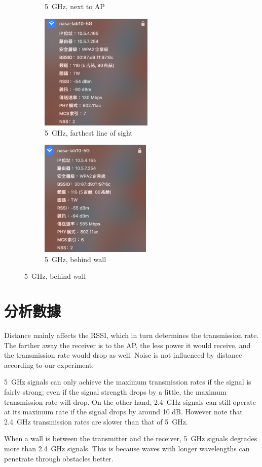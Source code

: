 \documentclass[12pt, a4paper]{article}
\begin{document}
\begin{figure}[H]
\begin{subfigure}{0.32\textwidth}
      \caption{5~GHz, next to AP}
    \end{subfigure}
    \hfill
    \begin{subfigure}{0.32\textwidth}
      \includegraphics[height=5.6cm]{5G_farthest.png}
      \caption{5~GHz, farthest line of sight}
    \end{subfigure}
    \hfill
    \begin{subfigure}{0.32\textwidth}
      \includegraphics[height=5.6cm]{5G_wall.png}
      \caption{5~GHz, behind wall}
    \end{subfigure}
  \end{figure}

  \section{分析數據}
  Distance mainly affects the RSSI, which in turn determines the transmission rate.
  The farther away the receiver is to the AP, the less power it would receive, and
  the transmission rate would drop as well. Noise is not influenced by distance
  according to our experiment.

  5~GHz signals can only achieve the maximum transmission rates if the signal is
  fairly strong; even if the signal strength drops by a little, the maximum
  transmission rate will drop. On the other hand, 2.4~GHz signals can still operate
  at its maximum rate if the signal drops by around 10 dB. However note that
  2.4~GHz transmission rates are slower than that of 5~GHz.

  When a wall is between the transmitter and the receiver, 5~GHz signals degrades
  more than 2.4~GHz signals. This is because waves with longer wavelengths can penetrate through obstacles better.
\end{document}
